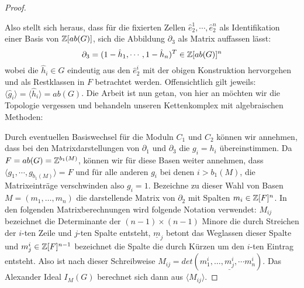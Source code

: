 \begin{proof}
\begin{center}
\end{center}


	Also stellt sich heraus, dass für die fixierten Zellen $\hat e_2^1,\cdots, \hat e_2^n$ als Identifikation einer Basis von $\mathbb{Z}[ab(G)]$, sich die Abbildung $\partial_3$ als Matrix auffassen lässt:
	\[
		\partial_3 = (1-\hat h_1,\cdots, 1-\hat h_n)^T \in \mathbb{Z}[ab(G)]^n
	\]
	wobei die $\hat h_i \in G$ eindeutig aus den $\hat e_2^i$ mit der obigen Konstruktion hervorgehen und als Restklassen in $F$ betrachtet werden. Offensichtlich gilt jeweils: $\langle \hat g_i \rangle = \langle \hat h_i \rangle = ab(G)$. Die Arbeit ist nun getan, von hier an möchten wir die Topologie vergessen und behandeln unseren Kettenkomplex mit algebraischen Methoden:

	Durch eventuellen Basiswechsel für die Moduln $C_1$ und $C_2$ können wir annehmen, dass bei den Matrixdarstellungen von $\partial_1$ und $\partial_3$ die $g_i=h_i$ übereinstimmen. Da $F=ab(G)=\mathbb{Z}^{b_1(M)}$, können wir für diese Basen weiter annehmen, dass $\langle g_1,\cdots,g_{b_1(M)}\rangle=F$ und für alle anderen $g_i$ bei denen $i> b_1(M)$, die Matrixeinträge verschwinden also $g_i=1$. Bezeichne zu dieser Wahl von Basen $M= (m_1,\dots,m_n)$ die darstellende Matrix von $\partial_2$ mit Spalten $m_i\in \mathbb{Z}[F]^n$. In den folgenden Matrixberechnungen wird folgende Notation verwendet: $M_{ij}$ bezeichnet die Determinante der $(n-1)\times (n-1)$ Minore die durch Streichen der $i$-ten Zeile und $j$-ten Spalte entsteht, $\underline m_j$ betont das Weglassen dieser Spalte und $m_j^i\in \mathbb{Z}[F]^{n-1}$ bezeichnet die Spalte die durch Kürzen um den $i$-ten Eintrag entsteht. Also ist nach dieser Schreibweise $M_{ij}=det(m^i_1, \dots , \underline {m^i_j} , \cdots m^i_n)$. Das Alexander Ideal $I_M(G)$ berechnet sich dann aus $\langle M_{ij} \rangle$.


\end{proof}
